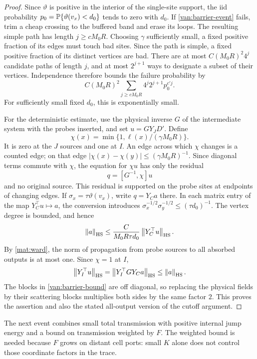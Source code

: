 \begin{proof}
Since $\vartheta$ is positive in the interior of the single-site
support, the iid probability
$p_0=\mathbb P\{\vartheta(v_x)<d_0\}$ tends to zero with $d_0$. If
\cref{van:barrier-event} fails, trim a cheap crossing to the buffered
band and erase its loops. The resulting simple path has length
$j\geq cM_0R$. Choosing $\gamma$ sufficiently small, a fixed positive
fraction of its edges must touch bad sites. Since the path is simple,
a fixed positive fraction of its distinct vertices are bad. There are
at most $C(M_0R)^2 4^j$ candidate paths of length $j$, and at most
$2^{j+1}$ ways to designate a subset of their vertices. Independence
therefore bounds the failure probability by
\[
 C(M_0R)^2\sum_{j\geq cM_0R}4^j2^{j+1}p_0^{c'j}.
\]
For sufficiently small fixed $d_0$, this is exponentially small.

For the deterministic estimate, use the physical inverse $G$ of the
intermediate system with the probes inserted, and set
$u=GY_JD'$. Define
\[
 \chi(x)=\min\{1,\ell(x)/(\gamma M_0R)\}.
\]
It is zero at the $J$ sources and one at $I$. An edge across which
$\chi$ changes is a counted edge; on that edge
$|\chi(x)-\chi(y)|\leq(\gamma M_0R)^{-1}$. Since diagonal terms
commute with $\chi$, the equation for $\chi u$ has only the residual
\[
 q=[G^{-1},\chi]u
\]
and no original source. This residual is supported on the probe sites
at endpoints of changing edges. If $\sigma_x=\tau\vartheta(v_x)$,
write $q=Y_C a$ there. In each matrix entry of the map
$Y_C^\top u\mapsto a$, the conversion introduces
$\sigma_x^{-1/2}\sigma_y^{-1/2}\leq(\tau d_0)^{-1}$.
The vertex degree is bounded, and hence
\begin{equation}\label{van:commutator-source}
 \left\lVert a\right\rVert_{\mathrm{HS}}
 \leq \frac{C}{M_0R\tau d_0}
       \left\lVert Y_C^\top u\right\rVert_{\mathrm{HS}}.
\end{equation}
By \cref{mat:ward}, the norm of propagation from probe sources to
all absorbed outputs is at most one. Since $\chi=1$ at $I$,
\[
 \left\lVert Y_I^\top u\right\rVert_{\mathrm{HS}}
 =\left\lVert Y_I^\top GY_Ca\right\rVert_{\mathrm{HS}}
 \leq\left\lVert a\right\rVert_{\mathrm{HS}}.
\]
The blocks in \cref{van:barrier-bound} are off diagonal, so replacing
the physical fields by their scattering blocks multiplies both sides
by the same factor $2$. This proves the assertion and also the stated
all-output version of the cutoff argument.
\end{proof}

The next event combines small total transmission with positive internal
jump energy and a bound on transmission weighted by $F$. The weighted
bound is needed because $F$ grows on distant cell ports: small $K$ alone
does not control those coordinate factors in the trace.

